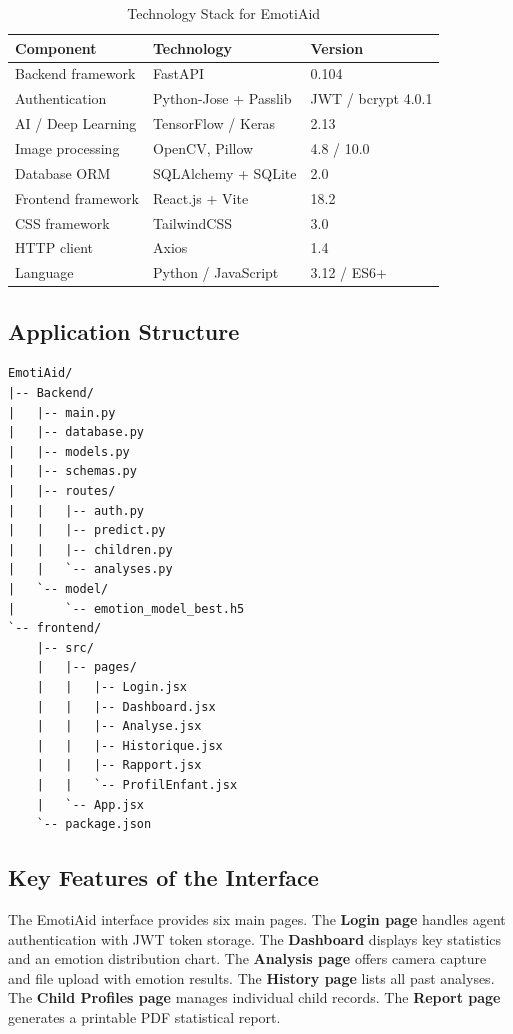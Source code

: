 \documentclass[a4paper,12pt,oneside]{report}
\begin{document}
\begin{table}[H]
\centering
\caption{Technology Stack for EmotiAid}
\begin{tabular}{|l|l|l|}
\hline
\textbf{Component} & \textbf{Technology} & \textbf{Version} \\
\hline
Backend framework & FastAPI & 0.104 \\
\hline
Authentication & Python-Jose + Passlib & JWT / bcrypt 4.0.1 \\
\hline
AI / Deep Learning & TensorFlow / Keras & 2.13 \\
\hline
Image processing & OpenCV, Pillow & 4.8 / 10.0 \\
\hline
Database ORM & SQLAlchemy + SQLite & 2.0 \\
\hline
Frontend framework & React.js + Vite & 18.2 \\
\hline
CSS framework & TailwindCSS & 3.0 \\
\hline
HTTP client & Axios & 1.4 \\
\hline
Language & Python / JavaScript & 3.12 / ES6+ \\
\hline
\end{tabular}
\label{tab:tech}
\end{table}

\subsection{Application Structure}

\begin{lstlisting}[caption={EmotiAid Project Structure}]
EmotiAid/
|-- Backend/
|   |-- main.py
|   |-- database.py
|   |-- models.py
|   |-- schemas.py
|   |-- routes/
|   |   |-- auth.py
|   |   |-- predict.py
|   |   |-- children.py
|   |   `-- analyses.py
|   `-- model/
|       `-- emotion_model_best.h5
`-- frontend/
    |-- src/
    |   |-- pages/
    |   |   |-- Login.jsx
    |   |   |-- Dashboard.jsx
    |   |   |-- Analyse.jsx
    |   |   |-- Historique.jsx
    |   |   |-- Rapport.jsx
    |   |   `-- ProfilEnfant.jsx
    |   `-- App.jsx
    `-- package.json
\end{lstlisting}

\subsection{Key Features of the Interface}

The EmotiAid interface provides six main pages. The \textbf{Login page} handles
agent authentication with JWT token storage. The \textbf{Dashboard} displays
key statistics and an emotion distribution chart. The \textbf{Analysis page}
offers camera capture and file upload with emotion results. The \textbf{History
page} lists all past analyses. The \textbf{Child Profiles page} manages
individual child records. The \textbf{Report page} generates a printable PDF
statistical report.
\end{document}
